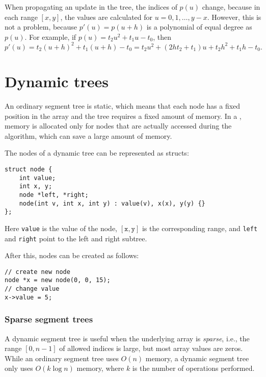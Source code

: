 When propagating an update in the tree,
the indices of $p(u)$ change,
because in each range $[x,y]$,
the values are
calculated for $u=0,1,\ldots,y-x$.
However, this is not a problem, because
$p'(u)=p(u+h)$ is a polynomial
of equal degree as $p(u)$.
For example, if $p(u)=t_2 u^2+t_1 u-t_0$, then
\[p'(u)=t_2(u+h)^2+t_1(u+h)-t_0=t_2 u^2 + (2ht_2+t_1)u+t_2h^2+t_1h-t_0.\]

\section{Dynamic trees}


An ordinary segment tree is static,
which means that each node has a fixed position
in the array and the tree requires
a fixed amount of memory.
In a ,
memory is allocated only for nodes that
are actually accessed during the algorithm,
which can save a large amount of memory.

The nodes of a dynamic tree can be represented as structs:
\begin{lstlisting}
struct node {
    int value;
    int x, y;
    node *left, *right;
    node(int v, int x, int y) : value(v), x(x), y(y) {}
};
\end{lstlisting}
Here \texttt{value} is the value of the node,
$[\texttt{x},\texttt{y}]$ is the corresponding range,
and \texttt{left} and \texttt{right} point to the left
and right subtree.

After this, nodes can be created as follows:
\begin{lstlisting}
// create new node
node *x = new node(0, 0, 15);
// change value
x->value = 5;
\end{lstlisting}

\subsubsection{Sparse segment trees}


A dynamic segment tree is useful when
the underlying array is \emph{sparse},
i.e., the range $[0,n-1]$
of allowed indices is large,
but most array values are zeros.
While an ordinary segment tree uses $O(n)$ memory,
a dynamic segment tree only uses $O(k \log n)$ memory,
where $k$ is the number of operations performed.

